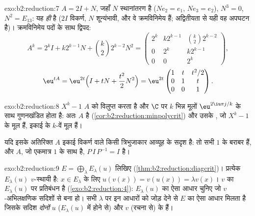 \begin{solution}{exo:b2:reduction:7}
$A = 2I + N$, जहाँ $N$ स्थानांतरण है ($N e_2 = e_1$, $Ne_3 = e_2$), $N^3 = 0$, $N^2 = E_{13}$: यह \emph{ही}  है ($2I$ विकर्ण, $N$ शून्यंभावी, और वे क्रमविनिमेय हैं;
अद्वितीयता से यही वह अपघटन है)। क्रमविनिमेय पदों के साथ द्विपद:
\[
A^k = 2^k I + k 2^{k-1} N + \binom k2 2^{k-2} N^2
= \begin{pmatrix}
2^k & k2^{k-1} & \binom k2 2^{k-2}\\
0 & 2^k & k2^{k-1}\\
0 & 0 & 2^k
\end{pmatrix},
\]
\[
\eu^{tA} = \eu^{2t}\Bigl(I + tN + \frac{t^2}{2}N^2\Bigr)
= \eu^{2t}\begin{pmatrix}
1 & t & t^2/2\\
0 & 1 & t\\
0 & 0 & 1
\end{pmatrix}.
\]
\end{solution}

\begin{solution}{exo:b2:reduction:8}
$X^k - 1$ $A$ को विलुप्त करता है और $\C$ पर $k$ भिन्न मूलों $\eu^{2\iu\pi j/k}$ के साथ
गुणनखंडित होता है: अतः $A$  है (\cref{cor:b2:reduction:minpolycrit}) और उसके ,
जो $X^k - 1$ के मूल हैं, इकाई के $k$-वें मूल हैं।

यदि इसके अतिरिक्त $A$ इकाई विकर्ण वाले किसी त्रिभुजाकार आव्यूह के सदृश
है: तो सभी  $1$ के बराबर हैं, और $A$, जो एकमात्र
 $1$ के साथ  है, $P\,I\,P^{-1} = I$ है।
\end{solution}

\begin{solution}{exo:b2:reduction:9}
$E = \bigoplus_\lambda E_\lambda(u)$ लिखिए (\cref{thm:b2:reduction:diagcrit})। प्रत्येक $E_\lambda(u)$ $v$-स्थायी है: $x \in E_\lambda$ के लिए $u(v(x)) = v(u(x)) = \lambda
v(x)$। $v$ का
$E_\lambda(u)$ पर प्रतिबंधन  है (\cref{exo:b2:reduction:4}): $E_\lambda(u)$ का ऐसा आधार चुनिए जो
$v$-अभिलक्षणिक सदिशों से बना हो। सभी $\lambda$ पर इन आधारों को जोड़ देने से
$E$ का ऐसा आधार मिलता है जिसके सदिश \emph{दोनों} $u$ ($E_\lambda(u)$ में होने
से) और $v$ (रचना से) के  हैं।
\end{solution}

